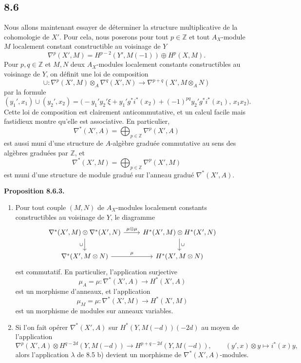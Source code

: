 \documentclass[11pt]{article}
\newenvironment{statement}[1]{\par\medskip\noindent\textbf{#1.}\ }{\par\medskip}
\begin{document}
\subsection*{8.6}

Nous allons maintenant essayer de déterminer la structure multiplicative de la cohomologie de $X'$. Pour cela, nous poserons pour tout $p\in\mathbb Z$ et tout $A_X$-module $M$ localement constant constructible au voisinage de $Y$
\[
\nabla^p(X',M)=H^{p-2}(Y',M(-1))\oplus H^p(X,M).
\]
Pour $p,q\in\mathbb Z$ et $M,N$ deux $A_X$-modules localement constants constructibles au voisinage de $Y$, on définit une loi de composition
\[
\cup:\nabla^p(X',M)\otimes_A\nabla^q(X',N)\to
\nabla^{p+q}(X',M\otimes_A N)
\tag{8.6.1}
\]
par la formule
\[
(y_1',x_1)\cup(y_2',x_2)=
\bigl(-y_1'y_2'\xi+y_1'g^*i^*(x_2)+(-1)^{pq}y_2'g^*i^*(x_1),\,x_1x_2\bigr).
\tag{8.6.2}
\]
Cette loi de composition est clairement anticommutative, et un calcul facile mais fastidieux montre qu'elle est associative. En particulier,
\[
\nabla^*(X',A)=\bigoplus_{p\in\mathbb Z}\nabla^p(X',A)
\]
est aussi muni d'une structure de $A$-algèbre graduée commutative au sens des algèbres graduées par $\mathbb Z$, et
\[
\nabla^*(X',M)=\bigoplus_{p\in\mathbb Z}\nabla^p(X',M)
\]
est muni d'une structure de module gradué sur l'anneau gradué $\nabla^*(X',A)$.

\begin{statement}{Proposition 8.6.3}
\begin{enumerate}[label=\alph*)]
\item Pour tout couple $(M,N)$ de $A_X$-modules localement constants constructibles au voisinage de $Y$, le diagramme
\[
\begin{tikzcd}
\nabla^*(X',M)\otimes\nabla^*(X',N)\arrow[r,"\mu\otimes\mu"]\arrow[d,"\cup"']&
H^*(X',M)\otimes H^*(X',N)\arrow[d,"\cup"]\\
\nabla^*(X',M\otimes N)\arrow[r,"\mu"]&
H^*(X',M\otimes N)
\end{tikzcd}
\]
est commutatif. En particulier, l'application surjective
\[
\mu_A=\mu:\nabla^*(X',A)\to H^*(X',A)
\]
est un morphisme d'anneaux, et l'application
\[
\mu_M=\mu:\nabla^*(X',M)\to H^*(X',M)
\]
est un morphisme de modules sur anneaux variables.
\item Si l'on fait opérer $\nabla^*(X',A)$ sur $H^*(Y,M(-d))(-2d)$ au moyen de l'application
\[
\nabla^p(X',A)\otimes H^{q-2d}(Y,M(-d))
\to H^{p+q-2d}(Y,M(-d)),
\qquad
(y',x)\otimes y\mapsto i^*(x)y,
\]
alors l'application $\lambda$ de 8.5 b) devient un morphisme de $\nabla^*(X',A)$-modules.
\end{enumerate}
\end{statement}
\end{document}
